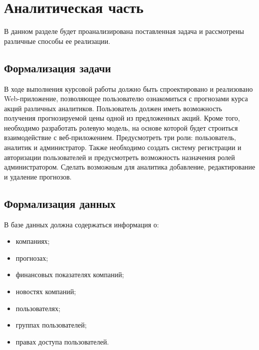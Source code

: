 \chapter{Аналитическая часть}

В данном разделе будет проанализирована поставленная задача и рассмотрены различные способы ее реализации.

\section{Формализация задачи}

В ходе выполнения курсовой работы должно быть спроектировано и реализовано Web-приложение, позволяющее пользователю ознакомиться с прогнозами курса акций различных аналитиков. Пользователь должен иметь возможность получения прогнозируемой цены одной из предложенных акций. 
Кроме того, необходимо разработать ролевую модель, на основе которой будет строиться взаимодействие с веб-приложением. Предусмотреть три роли: пользователь, аналитик и администратор. Также необходимо создать систему регистрации и авторизации пользователей и предусмотреть возможность назначения ролей администратором. Сделать возможным для аналитика добавление, редактирование и удаление прогнозов.


\section{Формализация данных} 
В базе данных должна содержаться информация о:
\begin{itemize}
	\item компаниях;
 	\item прогнозах;
  \item финансовых показателях компаний;
  \item новостях компаний;
  \item пользователях;
  \item группах пользователей;
  \item правах доступа пользователей.  
\end{itemize}



